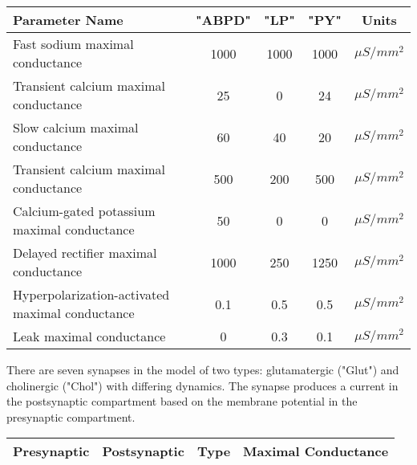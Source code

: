 \documentclass[utf8]{frontiers_suppmat} %
\begin{document}
		\begin{center}
			\begin{tabular}{|l|c|c|c|c|}
				\hline 
				\textbf{Parameter Name} & "ABPD" & "LP" & "PY" & \textbf{Units} \\ 
				\hline 
				Fast sodium maximal conductance & 1000 & 1000 & 1000 & $\mu S/mm^2$ \\ 
				\hline 
				Transient calcium maximal conductance & 25 & 0 & 24 & $\mu S/mm^2$ \\  
				\hline 
				Slow calcium maximal conductance & 60 & 40 & 20 & $\mu S/mm^2$ \\  
				\hline 
				Transient calcium maximal conductance & 500 & 200 & 500 & $\mu S/mm^2$ \\  
				\hline 
				Calcium-gated potassium maximal conductance & 50 & 0 & 0 & $\mu S/mm^2$ \\  
				\hline 
				Delayed rectifier maximal conductance & 1000 & 250 & 1250 & $\mu S/mm^2$ \\  
				\hline 
				Hyperpolarization-activated maximal conductance & 0.1 & 0.5 & 0.5 & $\mu S/mm^2$ \\  
				\hline 
				Leak maximal conductance & 0 & 0.3 & 0.1 & $\mu S/mm^2$ \\  
				\hline 
			\end{tabular}
		\end{center}
	
		There are seven synapses in the model of two types: glutamatergic ("Glut") and cholinergic ("Chol") with differing dynamics. The synapse produces a current in the postsynaptic compartment based on the membrane potential in the presynaptic compartment. 
		
		\begin{center}
			\begin{tabular}{c|c|c|c|}
				\hline
				\textbf{Presynaptic} & \textbf{Postsynaptic} & \textbf{Type} & \textbf{Maximal Conductance} \\
				\hline
				
			\end{tabular}
		\end{center} 


\printbibliography
\end{document}
